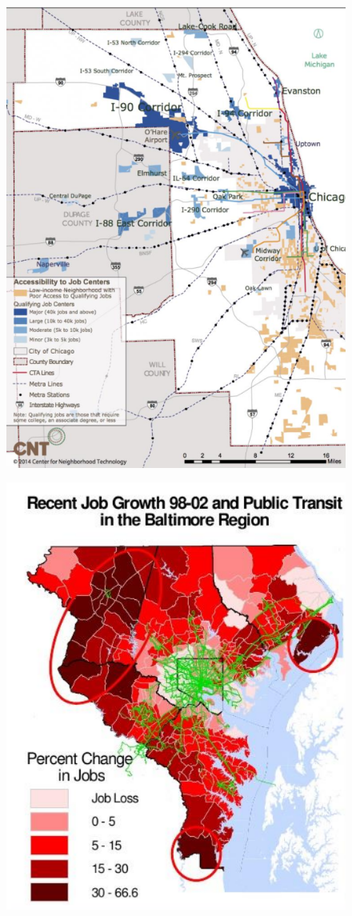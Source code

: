 \documentclass[aspectratio=169]{beamer}
\begin{document}
\begin{frame}
	
	\begin{figure}
		\centering
		\includegraphics[width=0.48\linewidth]{images/chicago_spatial_mismatch.png}
	\end{figure}
	
\end{frame}



\begin{frame}
	
	\begin{figure}
		\centering
		\includegraphics[width=0.54\linewidth]{images/baltimore_spatial_mismatch.png}
	\end{figure}
	
\end{frame}
\end{document}

